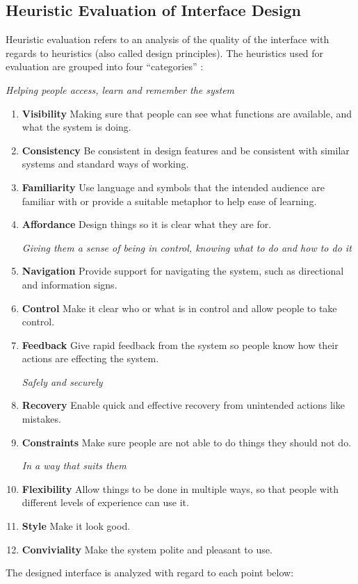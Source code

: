 \subsection{Heuristic Evaluation of Interface Design}
Heuristic evaluation refers to an analysis of the quality of the interface with regards to heuristics (also called design principles). The heuristics used for evaluation are grouped into four ``categories'' :

\textit{Helping people access, learn and remember the system}

\begin{enumerate}
	\item{\textbf{Visibility}} Making sure that people can see what functions are available, and what the system is doing.
	\item{\textbf{Consistency}} Be consistent in design features and be consistent with similar systems and standard ways of working.
	\item{\textbf{Familiarity}} Use language and symbols that the intended audience are familiar with or provide a suitable metaphor to help ease of learning.
	\item{\textbf{Affordance}} Design things so it is clear what they are for.
	
\textit{Giving them a sense of being in control, knowing what to do and how to do it}

	\item{\textbf{Navigation}} Provide support for navigating the system, such as directional and information signs.
	\item{\textbf{Control}} Make it clear who or what is in control and allow people to take control.
	\item{\textbf{Feedback}} Give rapid feedback from the system so people know how their actions are effecting the system.
	
	\textit{Safely and securely}

	\item{\textbf{Recovery}} Enable quick and effective recovery from unintended actions like mistakes.
	\item{\textbf{Constraints}} Make sure people are not able to do things they should not do.
	
	\textit{In a way that suits them}

	\item{\textbf{Flexibility}} Allow things to be done in multiple ways, so that people with different levels of experience can use it.
	\item{\textbf{Style}} Make it look good.
	\item{\textbf{Conviviality}} Make the system polite and pleasant to use.
\end{enumerate}
The designed interface is analyzed with regard to each point below:

